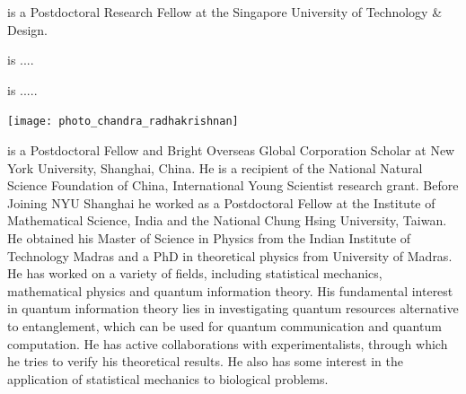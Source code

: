  is a Postdoctoral Research Fellow at the Singapore University of Technology \& Design.


%
%

\begin{center}
\end{center}

 is ....

%
%

\begin{center}
\end{center}

 is .....

%
%

\begin{center}
\texttt{[image: photo\_chandra\_radhakrishnan]}
\end{center}

 is a Postdoctoral Fellow and Bright Overseas Global Corporation Scholar at New York University, Shanghai, China. He is a recipient of the National Natural Science Foundation of China, International Young Scientist research grant. Before Joining NYU Shanghai he worked as a Postdoctoral Fellow at the Institute of Mathematical Science, India and the National Chung Hsing University, Taiwan. He obtained his Master of Science in Physics from the Indian Institute of Technology Madras and a PhD in theoretical physics from University of Madras. He has worked on a variety of fields, including statistical mechanics, mathematical physics and quantum information theory. His fundamental interest in quantum information theory lies in investigating quantum resources alternative to entanglement, which can be used for quantum communication and quantum computation. He has active collaborations with experimentalists, through which he tries to verify his theoretical results. He also has some interest in the application of statistical mechanics to biological problems.

%
%

